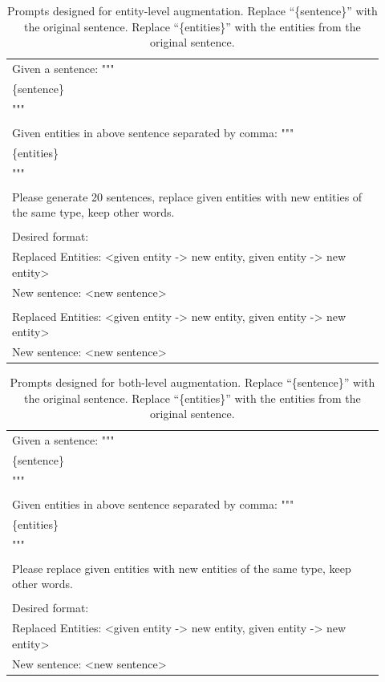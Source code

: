 \documentclass[11pt]{article}
\begin{document}
\begin{table}[ht]
\centering
    \begin{tabular}{m{0.92\linewidth}}
    \toprule

Given a sentence: """\\
\{sentence\}\\
"""\\
\\
Given entities in above sentence separated by comma: """\\
\{entities\}\\
"""\\
\\
Please generate 20 sentences, replace given entities with new entities of the same type, keep other words.\\
\\
Desired format:\\
Replaced Entities: <given entity -> new entity, given entity -> new entity>\\
New sentence: <new sentence>\\
\\
Replaced Entities: <given entity -> new entity, given entity -> new entity>\\
New sentence: <new sentence>\\ 
\bottomrule
\end{tabular}
\caption{Prompts designed for entity-level augmentation. Replace ``\{sentence\}'' with the original sentence. Replace ``\{entities\}'' with the entities from the original sentence.}
\label{tab:prompts-entity}
\end{table}


\begin{table}[ht]
\centering
    \begin{tabular}{m{0.92\linewidth}}
    \toprule
Given a sentence: """\\
\{sentence\}\\
"""\\
\\
Given entities in above sentence separated by comma: """\\
\{entities\}\\
"""\\
\\
Please replace given entities with new entities of the same type, keep other words.\\
\\
Desired format:\\
Replaced Entities: <given entity -> new entity, given entity -> new entity>\\
New sentence: <new sentence>\\ \bottomrule
\end{tabular}
\caption{Prompts designed for both-level augmentation. Replace ``\{sentence\}'' with the original sentence. Replace ``\{entities\}'' with the entities from the original sentence.}
\label{tab:prompts-both}
\end{table}
\end{document}
